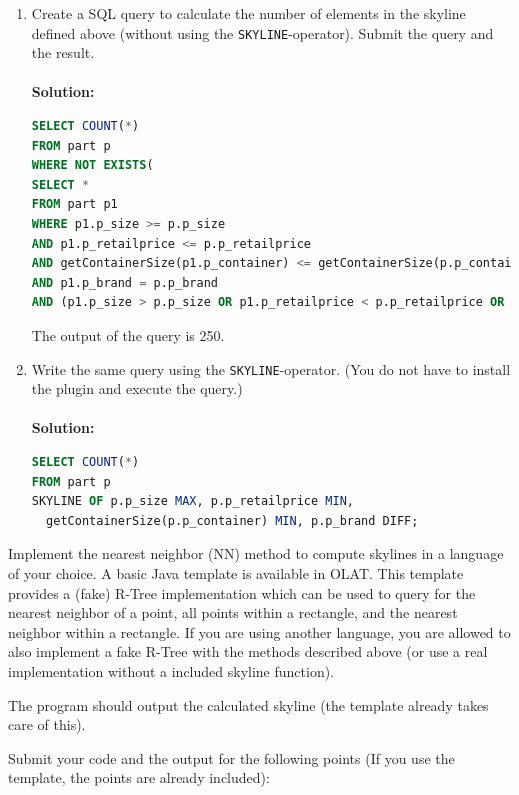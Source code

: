 \begin{enumerate}
\item Create a SQL query to calculate the number of elements in the skyline defined above (without using the \verb+SKYLINE+-operator).
Submit the query and the result.\\\\
{\bf Solution:}\\
\begin{lstlisting}[language=sql]
SELECT COUNT(*) 
FROM part p
WHERE NOT EXISTS(
SELECT *
FROM part p1
WHERE p1.p_size >= p.p_size
AND p1.p_retailprice <= p.p_retailprice
AND getContainerSize(p1.p_container) <= getContainerSize(p.p_container)
AND p1.p_brand = p.p_brand
AND (p1.p_size > p.p_size OR p1.p_retailprice < p.p_retailprice OR getContainerSize(p1.p_container) < getContainerSize(p.p_container)))
\end{lstlisting}

The output of the query is 250.


\item Write the same query using the \verb+SKYLINE+-operator. (You do not have to install the plugin and execute the query.)\\\\
{\bf Solution:}\\
\begin{lstlisting}[language=sql]
SELECT COUNT(*) 
FROM part p
SKYLINE OF p.p_size MAX, p.p_retailprice MIN, 
  getContainerSize(p.p_container) MIN, p.p_brand DIFF;
\end{lstlisting}

\end{enumerate}


Implement the nearest neighbor (NN) method to compute skylines in a language of your choice. A basic Java template is available in OLAT.
This template provides a (fake) R-Tree implementation which can be used to query for the nearest neighbor of a point, all points within a rectangle, and the nearest neighbor within a rectangle.
If you are using another language, you are allowed to also implement a fake R-Tree with the methods described above (or use a real implementation without a included skyline function).

The program should output the calculated skyline (the template already takes care of this).

Submit your code and the output for the following points (If you use the template, the points are already included):

